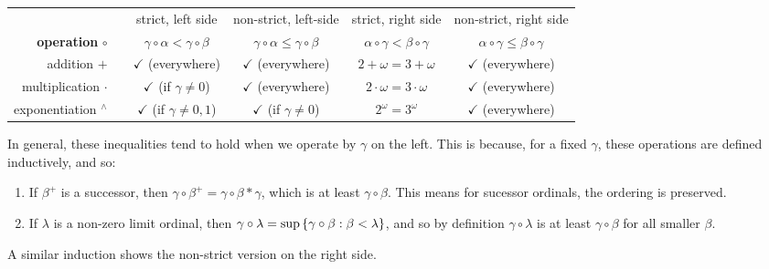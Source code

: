 \documentclass{article}
\begin{document}
\begin{table}[h!]
\small{
\begin{center}

\begin{tabular}{|r|c|c|c|c|c|}
\hline
& \!\!\!\!\!\! & strict, left side & non-strict, left-side & strict, right side & non-strict, right side \\
\textbf{operation} $\circ$ & \!\!\!\!\!\!
& $\gamma \circ \alpha < \gamma \circ \beta$
& $\gamma \circ \alpha \leq \gamma \circ \beta$
& $\alpha \circ \gamma < \beta \circ \gamma$
& $\alpha \circ \gamma \leq \beta \circ \gamma$ \\
\hline
addition $+$ & \!\!\!\!\!\! &
{\color{green_dark} $\checkmark$} (everywhere) &
{\color{green_dark} $\checkmark$} (everywhere) &
{\color{red_dark} $2 + \omega = 3 + \omega$} &
{\color{green_dark} $\checkmark$} (everywhere) \\ \hline
multiplication $\cdot$ & \!\!\!\!\!\! &
{\color{green_dark} $\checkmark$} (if $\gamma \neq 0$) &
{\color{green_dark} $\checkmark$} (everywhere) &
{\color{red_dark} $2 \cdot \omega = 3 \cdot \omega$} &
{\color{green_dark} $\checkmark$} (everywhere) \\ \hline
exponentiation $^\land$ & \!\!\!\!\!\! &
{\color{green_dark} $\checkmark$} (if $\gamma \neq 0, 1$) &
{\color{green_dark} $\checkmark$} (if $\gamma \neq 0$) &
{\color{red_dark} $2^\omega = 3^\omega$} &
{\color{green_dark} $\checkmark$} (everywhere) \\ \hline
\end{tabular}
\end{center}
}
\end{table}

In general, these inequalities tend to hold when we operate by $\gamma$ on the left. This is because, for a fixed $\gamma$, these operations are defined inductively, and so:
\begin{enumerate}
    \item If $\beta^+$ is a successor, then $\gamma \circ \beta^+ = \gamma \circ \beta * \gamma$, which is at least $\gamma \circ \beta$. This means for sucessor ordinals, the ordering is preserved.
    \item If $\lambda$ is a non-zero limit ordinal, then $\gamma \circ \lambda = \sup \left\lbrace \gamma \circ \beta : \beta < \lambda \right\rbrace$, and so by definition $\gamma \circ \lambda$ is at least $\gamma \circ \beta$ for all smaller $\beta$.
\end{enumerate}
A similar induction shows the non-strict version on the right side.
\end{document}
